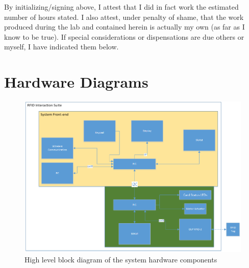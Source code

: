 \documentclass[12pt]{article} %
\begin{document}
By initializing/signing above, I attest that I did in fact work the
estimated number of hours stated. I also attest, under penalty of shame,
that the work produced during the lab and contained herein is actually my
own (as far as I know to be true). If special considerations or
dispensations are due others or myself, I have indicated them below.

\pagebreak

\section{Hardware Diagrams\label{appendix:hwDiagrams}}
\begin{figure}[H]
	\centering
	\includegraphics[width=\textwidth]{images/BlockDiagram.png}
	\caption{High level block diagram of the system hardware components}
	\label{fig:highLevelBlockDiagram}
\end{figure}
\end{document}
